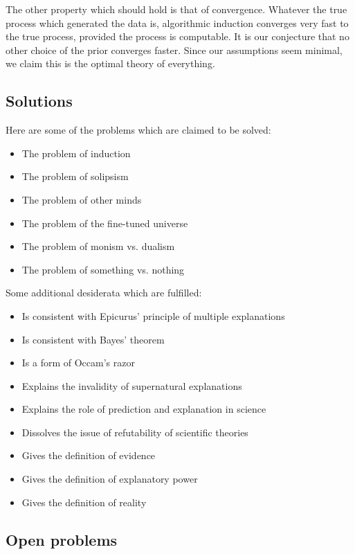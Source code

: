 \documentclass[oneside,hidelinks]{article}
\begin{document}
The other property which should hold is that of convergence.
Whatever the true process which generated the data is, algorithmic induction converges very fast to the true process, provided the process is computable.
It is our conjecture that no other choice of the prior converges faster.
Since our assumptions seem minimal, we claim this is the optimal theory of everything.

\newpage

\subsection{Solutions}

Here are some of the problems which are claimed to be solved:

\begin{itemize}
\item The problem of induction
\item The problem of solipsism
\item The problem of other minds
\item The problem of the fine-tuned universe
\item The problem of monism vs. dualism
\item The problem of something vs. nothing
\end{itemize}

\noindent
Some additional desiderata which are fulfilled:

\begin{itemize}
\item Is consistent with Epicurus' principle of multiple explanations
\item Is consistent with Bayes' theorem
\item Is a form of Occam's razor
\item Explains the invalidity of supernatural explanations
\item Explains the role of prediction and explanation in science
\item Dissolves the issue of refutability of scientific theories
\item Gives the definition of evidence
\item Gives the definition of explanatory power
\item Gives the definition of reality
\end{itemize}

\newpage

\subsection{Open problems}
\end{document}
